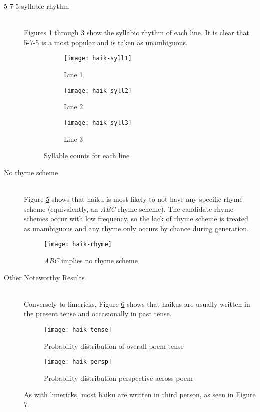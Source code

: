\begin{description}
\item[5-7-5 syllabic rhythm]  \hfill \\
Figures \ref{fig:haik-syll1} through \ref{fig:haik-syll3} show the syllabic rhythm of each line. It is clear that 5-7-5 is a most popular and is taken as unambiguous.

\begin{figure}[H]
\centering
\begin{subfigure}[t]{0.5\textwidth}
	\centering
    \texttt{[image: haik-syll1]}
    \caption{Line 1}
    \label{fig:haik-syll1}
\end{subfigure}
\begin{subfigure}[t]{0.5\textwidth}
	\centering
    \texttt{[image: haik-syll2]}
    \caption{Line 2}
    \label{fig:haik-syll2}
\end{subfigure}
\begin{subfigure}[t]{0.9\textwidth}
	\centering
    \texttt{[image: haik-syll3]}
    \caption{Line 3}
    \label{fig:haik-syll3}
\end{subfigure}
\caption{Syllable counts for each line}
\label{fig:haik3}
\end{figure}

\item[No rhyme scheme]  \hfill \\
Figure \ref{fig:haik-rhyme} shows that haiku is most likely to not have any specific rhyme scheme (equivalently, an \textit{ABC} rhyme scheme). The candidate rhyme schemes occur with low frequency, so the lack of rhyme scheme is treated as unambiguous and any rhyme only occurs by chance during generation.

\begin{figure}[H]
\centering
\texttt{[image: haik-rhyme]}
\caption{\textit{ABC} implies no rhyme scheme}
\label{fig:haik-rhyme}
\end{figure}

\item[Other Noteworthy Results]  \hfill \\
Conversely to limericks, Figure \ref{fig:haik-tense} shows that haikus are usually written in the present tense and occasionally in past tense.

\begin{figure}[H]
\centering
\texttt{[image: haik-tense]}
\caption{Probability distribution of overall poem tense}
\label{fig:haik-tense}
\end{figure}

\begin{figure}[H]
\centering
\texttt{[image: haik-persp]}
\caption{Probability distribution perspective across poem}
\label{fig:haik-persp}
\end{figure}

As with limericks, most haiku are written in third person, as seen in Figure \ref{fig:haik-persp}.

\end{description}


